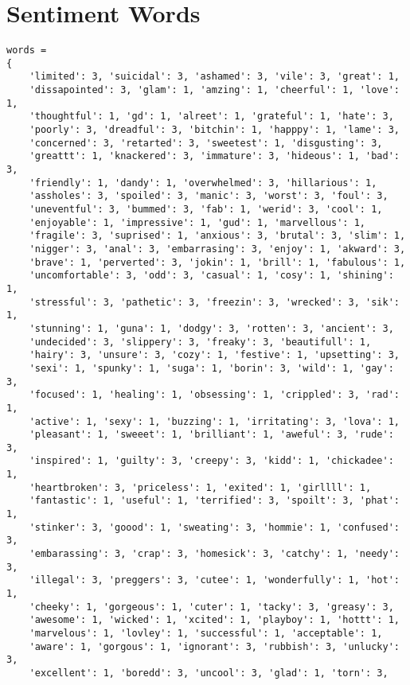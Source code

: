 \section{Sentiment Words} %
\label{app:sentiment_words}
	\begin{lstlisting}[caption={\textit{sentiment\_words.py}: sentiment words}]
words = 
{
    'limited': 3, 'suicidal': 3, 'ashamed': 3, 'vile': 3, 'great': 1,
    'dissapointed': 3, 'glam': 1, 'amzing': 1, 'cheerful': 1, 'love': 1,
    'thoughtful': 1, 'gd': 1, 'alreet': 1, 'grateful': 1, 'hate': 3,
    'poorly': 3, 'dreadful': 3, 'bitchin': 1, 'happpy': 1, 'lame': 3,
    'concerned': 3, 'retarted': 3, 'sweetest': 1, 'disgusting': 3,
    'greattt': 1, 'knackered': 3, 'immature': 3, 'hideous': 1, 'bad': 3,
    'friendly': 1, 'dandy': 1, 'overwhelmed': 3, 'hillarious': 1,
    'assholes': 3, 'spoiled': 3, 'manic': 3, 'worst': 3, 'foul': 3,
    'uneventful': 3, 'bummed': 3, 'fab': 1, 'werid': 3, 'cool': 1,
    'enjoyable': 1, 'impressive': 1, 'gud': 1, 'marvellous': 1,
    'fragile': 3, 'suprised': 1, 'anxious': 3, 'brutal': 3, 'slim': 1,
    'nigger': 3, 'anal': 3, 'embarrasing': 3, 'enjoy': 1, 'akward': 3,
    'brave': 1, 'perverted': 3, 'jokin': 1, 'brill': 1, 'fabulous': 1,
    'uncomfortable': 3, 'odd': 3, 'casual': 1, 'cosy': 1, 'shining': 1,
    'stressful': 3, 'pathetic': 3, 'freezin': 3, 'wrecked': 3, 'sik': 1,
    'stunning': 1, 'guna': 1, 'dodgy': 3, 'rotten': 3, 'ancient': 3,
    'undecided': 3, 'slippery': 3, 'freaky': 3, 'beautifull': 1,
    'hairy': 3, 'unsure': 3, 'cozy': 1, 'festive': 1, 'upsetting': 3,
    'sexi': 1, 'spunky': 1, 'suga': 1, 'borin': 3, 'wild': 1, 'gay': 3,
    'focused': 1, 'healing': 1, 'obsessing': 1, 'crippled': 3, 'rad': 1,
    'active': 1, 'sexy': 1, 'buzzing': 1, 'irritating': 3, 'lova': 1,
    'pleasant': 1, 'sweeet': 1, 'brilliant': 1, 'aweful': 3, 'rude': 3,
    'inspired': 1, 'guilty': 3, 'creepy': 3, 'kidd': 1, 'chickadee': 1,
    'heartbroken': 3, 'priceless': 1, 'exited': 1, 'girllll': 1,
    'fantastic': 1, 'useful': 1, 'terrified': 3, 'spoilt': 3, 'phat': 1,
    'stinker': 3, 'goood': 1, 'sweating': 3, 'hommie': 1, 'confused': 3,
    'embarassing': 3, 'crap': 3, 'homesick': 3, 'catchy': 1, 'needy': 3,
    'illegal': 3, 'preggers': 3, 'cutee': 1, 'wonderfully': 1, 'hot': 1,
    'cheeky': 1, 'gorgeous': 1, 'cuter': 1, 'tacky': 3, 'greasy': 3,
    'awesome': 1, 'wicked': 1, 'xcited': 1, 'playboy': 1, 'hottt': 1,
    'marvelous': 1, 'lovley': 1, 'successful': 1, 'acceptable': 1,
    'aware': 1, 'gorgous': 1, 'ignorant': 3, 'rubbish': 3, 'unlucky': 3,
    'excellent': 1, 'boredd': 3, 'uncool': 3, 'glad': 1, 'torn': 3,

\end{lstlisting}
